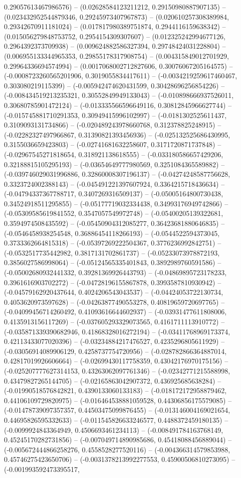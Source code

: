 0.29057613467986576) -- (0.02628584123211212, 0.29150980887907135) -- (0.023432952544879346, 0.29245973407967873) -- (0.020610257308389984, 0.29342670911181024) -- (0.017817980389751874, 0.2944116159638342) -- (0.015056279848753752, 0.2954154309307607) -- (0.012325242994677126, 0.2964392373709938) -- (0.009624882586327394, 0.29748424031228804) -- (0.006955133344965353, 0.29855178317908754) -- (0.004315849012701929, 0.29964336694574994) -- (0.0017068002712827606, 0.30076067205164575) -- (-0.0008723260565201906, 0.3019055834417611) -- (-0.0034219259617460467, 0.303080219115399) -- (-0.005942474620431599, 0.30428696256854226) -- (-0.008434519213235321, 0.30552849949133043) -- (-0.010898666937526011, 0.30680785901472124) -- (-0.013335566596649116, 0.30812845966627744) -- (-0.015745881710291353, 0.30949415996102997) -- (-0.0181302525611437, 0.3109093131734866) -- (-0.020489243978660768, 0.312378825248915) -- (-0.02282327497966867, 0.31390821393456936) -- (-0.025132525686430995, 0.3155036659423803) -- (-0.02741681632258607, 0.3171720871737848) -- (-0.02967545271818654, 0.318921138618555) -- (-0.033180586657429206, 0.32188815105295193) -- (-0.03654649777980569, 0.3251084365589882) -- (-0.039746029031996886, 0.32860008307196137) -- (-0.04274248587756628, 0.3323724002388143) -- (-0.045491221397607924, 0.3364215718436634) -- (-0.04794337367788717, 0.3407269316509137) -- (-0.05005164800730438, 0.34524918511295855) -- (-0.05177719032334438, 0.34993176949742866) -- (-0.05309585619841552, 0.3547057549972748) -- (-0.05400205139322681, 0.3594974508435592) -- (-0.05450904312085277, 0.36423681880646835) -- (-0.0546458938254548, 0.36886454118266193) -- (-0.0544522594373045, 0.3733362664815318) -- (-0.05397269222504367, 0.3776236992842751) -- (-0.0532517735442982, 0.3817131702861737) -- (-0.05233073978872193, 0.3856027586998064) -- (-0.05124565335401843, 0.3892989760591586) -- (-0.05002680932441332, 0.39281369926443793) -- (-0.04869895723178233, 0.3961616903702272) -- (-0.04728196155867878, 0.3993587810930942) -- (-0.04579162920437644, 0.4024206543043537) -- (-0.04424053722130734, 0.4053620973597628) -- (-0.04263877490553278, 0.40819659720697765) -- (-0.04099456714260492, 0.41093616644602937) -- (-0.03931477611808006, 0.4135913156117269) -- (-0.037605293329073565, 0.4161711113910772) -- (-0.035871339390682946, 0.41868328016272194) -- (-0.03411768969173374, 0.42113433077020396) -- (-0.03234884217476527, 0.4235296805611929) -- (-0.03056914089906129, 0.4258737754720956) -- (-0.028782866364887014, 0.42817019926606664) -- (-0.02699430117758359, 0.43042176970175156) -- (-0.025207777627314153, 0.43263062097761346) -- (-0.02342771215588998, 0.43479827265144705) -- (-0.02165863042907372, 0.436925685638284) -- (-0.01990518576842821, 0.4390133060133183) -- (-0.018172172958879462, 0.44106109729820975) -- (-0.016464538881059528, 0.44306856175579085) -- (-0.01478739097357357, 0.44503475099876455) -- (-0.013146004169021654, 0.44695826595332633) -- (-0.011545826633246577, 0.4488372459180135) -- (-0.0099924843364949, 0.4506693461234113) -- (-0.008491784163768149, 0.45245170282731856) -- (-0.007049714890985686, 0.45418088456889044) -- (-0.005672444866258276, 0.4558528277520116) -- (-0.004366314579853988, 0.45746275423650706) -- (-0.0031378213992277553, 0.45900506810273095) -- (-0.001993592473395517, 